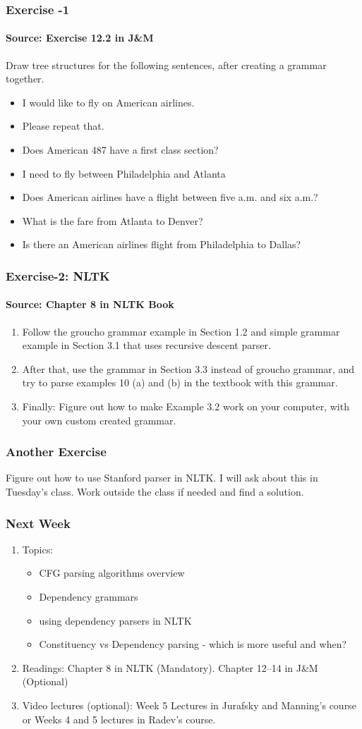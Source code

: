 \documentclass{beamer}
\begin{document}
\begin{frame}
\frametitle{Exercise -1}
\framesubtitle{Source: Exercise 12.2 in J\&M}
Draw tree structures for the following sentences, after creating a grammar together.
\begin{itemize}
\item I would like to fly on American airlines.
\item Please repeat that.
\item Does American 487 have a first class section?
\item I need to fly between Philadelphia and Atlanta
\item Does American airlines have a flight between five a.m. and six a.m.?
\item What is the fare from Atlanta to Denver?
\item Is there an American airlines flight from Philadelphia to Dallas?
\end{itemize}
\end{frame}

\begin{frame}
\frametitle{Exercise-2: NLTK}
\framesubtitle{Source: Chapter 8 in NLTK Book}
\begin{enumerate}
\item Follow the groucho grammar example in Section 1.2 and simple grammar example in Section 3.1 that uses recursive descent parser.
\item After that, use the grammar in Section 3.3 instead of groucho grammar, and try to parse examples 10 (a) and (b) in the textbook with this grammar.
\item Finally: Figure out how to make Example 3.2 work on your computer, with your own custom created grammar.
\end{enumerate}
\end{frame}

\begin{frame}
\frametitle{Another Exercise}
Figure out how to use Stanford parser in NLTK. I will ask about this in Tuesday's class. Work outside the class if needed and find a solution.
\end{frame}

\begin{frame}
\frametitle{Next Week}
\begin{enumerate}
\item Topics: 
\begin{itemize}
\item CFG parsing algorithms overview
\item Dependency grammars
\item using dependency parsers in NLTK
\item Constituency vs Dependency parsing - which is more useful and when?
\end{itemize}
\item Readings: Chapter 8 in NLTK (Mandatory). Chapter 12--14 in J\&M (Optional)
\item Video lectures (optional): Week 5 Lectures in Jurafsky and Manning's course or Weeks 4 and 5 lectures in Radev's course.
\end{enumerate}
\end{frame}
\end{document}
